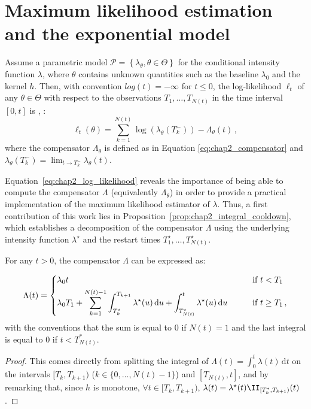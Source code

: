 \section{Maximum likelihood estimation and the exponential model}
\label{sec:chap2_mle}

Assume a parametric model $\mathcal P = \left\{ \lambda_\theta, \theta \in \Theta \right\}$ for the conditional intensity function $\lambda$, where $\theta$ contains unknown quantities such as the baseline $\lambda_0$ and the kernel $h$.
Then, with convention $log(t) = -\infty$ for $t\leq0$, the log-likelihood $\ell_t$ of any $\theta \in \Theta$ with respect to the observations $T_1,\ldots, T_{N(t)}$ in the time interval $[0,t]$ is \parencite[Proposition 7.2.III.]{DaleyV1}, \parencite{Ozaki1979}:
\begin{equation}\label{eq:chap2_log_likelihood}
    \ell_t(\theta) = \sum_{k=1}^{N(t)}{\log{(\lambda_\theta(T_k^-))}} - \Lambda_\theta(t)\,,
\end{equation}
where the compensator $\Lambda_\theta$ is defined as in Equation \eqref{eq:chap2_compensator} and $\lambda_\theta(T_k^-) = \lim_{t \to T_k^-} \lambda_\theta(t)$.

Equation~\eqref{eq:chap2_log_likelihood} reveals the importance of being able to compute the compensator $\Lambda$ (equivalently $\Lambda_\theta$) in order to provide a practical implementation of the maximum likelihood estimator of $\lambda$.
Thus, a first contribution of this work lies in Proposition~\ref{prop:chap2_integral_cooldown}, which establishes a decomposition of the compensator $\Lambda$ using the underlying intensity function $\lambda^\star$ and the restart times $T_{1}^\star,\ldots, T_{N(t)}^\star$.

\begin{proposition}\label{prop:chap2_integral_cooldown}
For any $t>0$, the compensator $\Lambda$ can be expressed as:

\begin{equation}\label{eq:chap2_compensator_general}
\Lambda(t) =
\begin{dcases}
    \lambda_0 t &\text{\qquad if $t<T_1$}\\
    \lambda_0 T_1 + \sum_{k=1}^{{N(t)-1}}{\int_{T_{k}^\star}^{T_{k+1}}{\lambda^\star(u)\,\mathrm{d}u}} + \int_{T_{N(t)}^\star}^{t}{\lambda^\star(u)\,\mathrm{d}u} &\text{\qquad if $t\geq T_1$}\,,
\end{dcases}
\end{equation}
with the conventions that the sum is equal to $0$ if ${N(t)} = 1$ and the last integral is equal to $0$ if $t < T_{N(t)}^*$.
\end{proposition}
\begin{proof}
This comes directly from splitting the integral of $\Lambda(t) = \int_{0}^{t}{\lambda(t)\,\mathrm{d}t}$ on the intervals $[T_k, T_{k+1})$ ($k \in \{ 0, \dots, N(t)-1 \}$) and $[T_{N(t)}, t]$, and by remarking that, since $h$ is monotone, $\forall t\in[T_k, T_{k+1})$, $\lambda(t) = \lambda^\star(t)\II_{[T_k^*,T_{k+1})}(t)$.

\end{proof}

